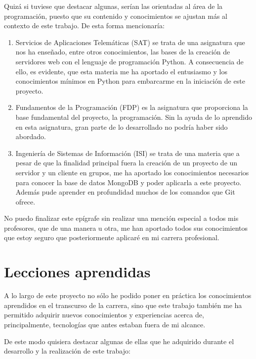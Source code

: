 \documentclass[a4paper, 12pt]{book}
\begin{document}
Quizá si tuviese que destacar algunas, serían las orientadas al área de la programación, puesto que su contenido y conocimientos se ajustan más al contexto de este trabajo. De esta forma mencionaría:

\begin{enumerate}
  \item Servicios de Aplicaciones Telemáticas (SAT) se trata de una asignatura que nos ha enseñado, entre otros conocimientos, las bases de la creación de servidores web con el lenguaje de programación Python. A consecuencia de ello, es evidente, que esta materia me ha aportado el entusiasmo y los conocimientos mínimos en Python para embarcarme en la iniciación de este proyecto.
  
  \item Fundamentos de la Programación (FDP) es la asignatura que proporciona la base fundamental del proyecto, la programación. Sin la ayuda de lo aprendido en esta asignatura, gran parte de lo desarrollado no podría haber sido abordado.
  
  \item Ingeniería de Sistemas de Información (ISI) se trata de una materia que a pesar de que la finalidad principal fuera la creación de un proyecto de un servidor y un cliente en grupos, me ha aportado los conocimientos necesarios para conocer la base de datos MongoDB y poder aplicarla a este proyecto. Además pude aprender en profundidad muchos de los comandos que Git ofrece.
\end{enumerate}

No puedo finalizar este epígrafe sin realizar una mención especial a todos mis profesores, que de una manera u otra, me han aportado todos sus conocimientos que estoy seguro que posteriormente aplicaré en mi carrera profesional.


\section{Lecciones aprendidas}
\label{sec:lecciones_aprendidas}

A lo largo de este proyecto no sólo he podido poner en práctica los conocimientos aprendidos en el transcurso de la carrera, sino que este trabajo también me ha permitido adquirir nuevos conocimientos y experiencias acerca de, principalmente, tecnologías que antes estaban fuera de mi alcance.

De este modo quisiera destacar algunas de ellas que he adquirido durante el desarrollo y la realización de este trabajo:
\end{document}
